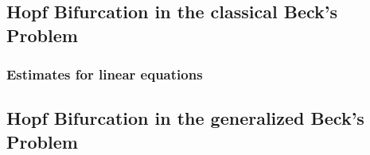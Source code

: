 
\subsection{Hopf Bifurcation in the classical Beck's Problem}
\subsubsection{Estimates for linear equations}
\subsection{Hopf Bifurcation in the generalized Beck's Problem}
